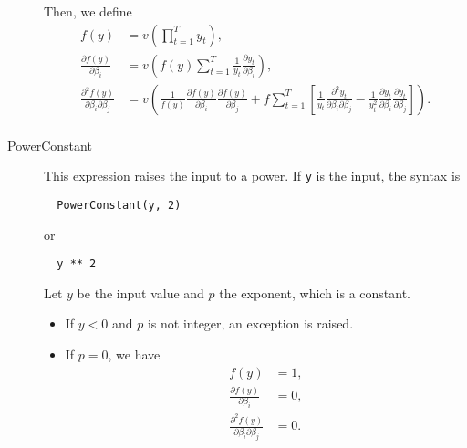 \documentclass[12pt,a4paper]{article}
\begin{document}
\begin{description}
Then, we define
  \begin{align*}
    f(y) &= v\left(\prod_{t=1}^T y_t\right), \\
    \frac{\partial f(y)}{\partial \beta_i} &= v\left(f(y)\sum_{t=1}^T \frac{1}{y_t} \frac{\partial y_t}{\partial \beta_i}\right),\\
    \frac{\partial^2 f(y)}{\partial \beta_i\partial \beta_j} &= v\left(\frac{1}{f(y)}\frac{\partial f(y)}{\partial \beta_i}\frac{\partial f(y)}{\partial \beta_j} + f \sum_{t=1}^T\left[\frac{1}{y_t}\frac{\partial^2 y_t}{\partial \beta_i \partial \beta_j } - \frac{1}{y_t^2} \frac{\partial y_t}{\partial \beta_i}\frac{\partial y_t}{\partial \beta_j} \right]\right).\\
  \end{align*}

  \item[PowerConstant] This expression raises the input to a power. If \lstinline+y+ is the input, the syntax is
\begin{lstlisting}
  PowerConstant(y, 2)
\end{lstlisting}
or
\begin{lstlisting}
  y ** 2
\end{lstlisting}
Let $y$ be the input value and $p$ the exponent, which is a constant.
\begin{itemize}
\item If $y < 0$ and $p$ is not integer, an exception is raised.
\item If $p=0$, we have
 \begin{align*}
    f(y)& = 1, \\ 
    \frac{\partial f(y)}{\partial \beta_i} &= 0, \\
    \frac{\partial^2 f(y)}{\partial \beta_i \partial \beta_j} &= 0.
      \end{align*}


\end{itemize}
\end{description}
\end{document}
